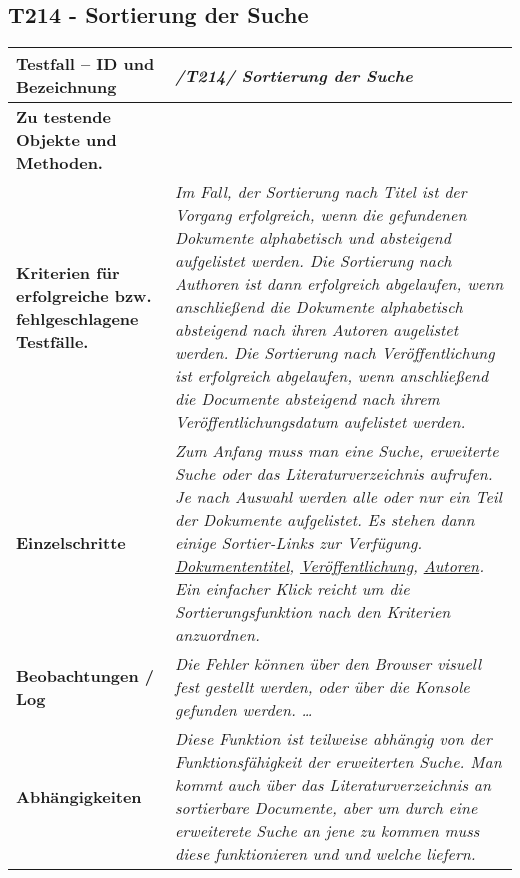 \subsection{T214 - Sortierung der Suche  }
\begin{longtable}{|p{5cm}|p{10cm}|}
\hline
\textbf{Testfall -- ID und Bezeichnung} &  \textit{                                                        /T214/ Sortierung der Suche} \\
\hline
\textbf {Zu testende Objekte und Methoden.}  &  
\textit {
\begin{itemize}
    \item Sortieren nach verschiedenen Kriterien
\end{itemize}}
\\
\hline
\textbf{Kriterien f\"ur erfolgreiche bzw. fehlgeschlagene Testf\"alle. } &
\textit{Im Fall, der Sortierung nach Titel ist der Vorgang erfolgreich, wenn die gefundenen Dokumente alphabetisch und absteigend aufgelistet werden. Die Sortierung nach Authoren ist dann erfolgreich abgelaufen, wenn anschließend die Dokumente alphabetisch absteigend nach ihren Autoren augelistet werden. Die Sortierung nach Veröffentlichung ist erfolgreich abgelaufen, wenn anschließend die Documente absteigend nach ihrem Veröffentlichungsdatum aufelistet werden. } \\
\hline
\textbf{Einzelschritte} &  \textit{Zum Anfang muss man eine Suche, erweiterte Suche oder das Literaturverzeichnis aufrufen. Je nach Auswahl werden alle oder nur ein Teil der Dokumente aufgelistet. Es stehen dann einige Sortier-Links zur Verfügung. \uline{Dokumententitel}, \uline{Veröffentlichung}, \uline{Autoren}. Ein einfacher Klick reicht um die Sortierungsfunktion nach den Kriterien anzuordnen.} \\
\hline
\textbf{Beobachtungen / Log} &  \textit{ Die Fehler können über den Browser visuell fest gestellt werden, oder über die Konsole gefunden werden. \ldots} \\
\hline
\textbf{Abh\"angigkeiten} &  \textit{Diese Funktion ist teilweise abhängig von der Funktionsfähigkeit der erweiterten Suche. Man kommt auch über das Literaturverzeichnis an sortierbare Documente, aber um durch eine erweiterete Suche an jene zu kommen muss diese funktionieren und und welche liefern. } \\
\hline

 \end{longtable}




